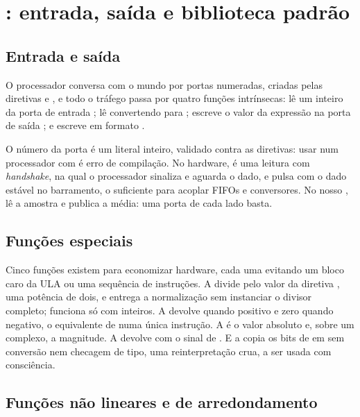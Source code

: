 \chapter{\cmm{}: entrada, saída e biblioteca padrão}
\label{cap:cmm-io-stdlib}

\section{Entrada e saída}
\label{sec:io}

O processador conversa com o mundo por portas numeradas, criadas pelas diretivas  e , e todo o tráfego passa por quatro funções intrínsecas:  lê um inteiro da porta de entrada ;  lê convertendo para ;  escreve o valor da expressão na porta de saída ; e  escreve em formato .

O número da porta é um literal inteiro, validado contra as diretivas: usar  num processador com  é erro de compilação. No hardware,  é uma leitura com \textit{handshake}, na qual o processador sinaliza  e aguarda o dado, e  pulsa  com o dado estável no barramento, o suficiente para acoplar FIFOs e conversores. No nosso ,  lê a amostra e  publica a média: uma porta de cada lado basta.

\section{Funções especiais}

Cinco funções existem para economizar hardware, cada uma evitando um bloco caro da ULA ou uma sequência de instruções. A  divide pelo valor da diretiva , uma potência de dois, e entrega a normalização sem instanciar o divisor completo; funciona só com inteiros. A  devolve  quando positivo e zero quando negativo, o equivalente de  numa única instrução. A  é o valor absoluto e, sobre um complexo, a magnitude. A  devolve  com o sinal de . E a  copia os bits de  em  sem conversão nem checagem de tipo, uma reinterpretação crua, a ser usada com consciência.

\section{Funções não lineares e de arredondamento}

